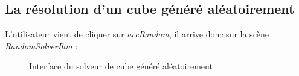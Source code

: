\subsection{La résolution d'un cube généré aléatoirement}
L'utilisateur vient de cliquer sur \textit{accRandom}, il arrive donc sur la scène \textit{RandomSolverIhm} :

\begin{figure}[H]
\begin{center}
\end{center}
	\caption{Interface du solveur de cube généré aléatoirement}
\end{figure}

